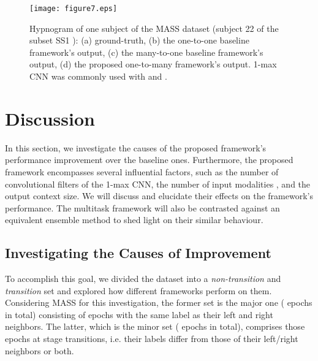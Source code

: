 \documentclass[10pt,twocolumn,twoside]{IEEEtran}
\begin{document}
\begin{table}[t!]
\begin{center}
\begin{tabular}
			\end{tabular}
		\end{center}
		\label{tab:confusion_matrix}
\end{table}

\begin{figure*} [!t]
	\centering
	\texttt{[image: figure7.eps]}
	\caption{Hypnogram of one subject of the MASS dataset (subject 22 of the subset SS1 \cite{Oreilly2014}): (a) ground-truth, (b) the one-to-one baseline framework's output, (c) the many-to-one baseline framework's output, (d) the proposed one-to-many framework's output. 1-max CNN was commonly used with  and .}
	\label{fig:hypnogram_mass}
\end{figure*}

\section{Discussion}
\label{sec:discussion}

In this section, we investigate the causes of the proposed framework's performance improvement over the baseline ones. Furthermore, the proposed framework encompasses several influential factors, such as the number of convolutional filters  of the 1-max CNN, the number of input modalities , and  the output context size.  We will discuss and elucidate their effects on the framework's performance. 
The multitask framework will also be contrasted against an equivalent ensemble method to shed light on their similar behaviour.

\subsection{Investigating the Causes of Improvement}

To accomplish this goal, we divided the dataset into a \emph{non-transition} and \emph{transition} set and explored how different frameworks perform on them. Considering MASS for this investigation, the former set is the major one ( epochs in total) consisting of epochs with the same label as their left and right neighbors. The latter, which is the minor set ( epochs in total), comprises those epochs at stage transitions, i.e. their labels differ from those of their left/right neighbors or both.
\end{document}
